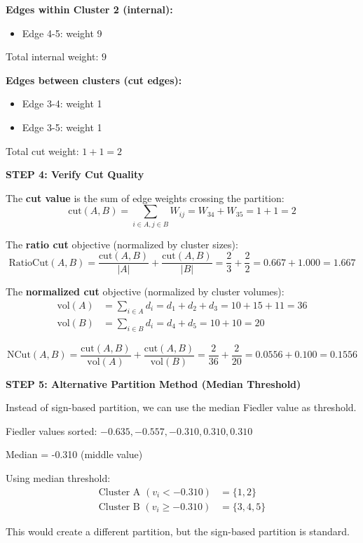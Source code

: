 \documentclass[12pt]{article}
\begin{document}
\begin{solution}
\textbf{Edges within Cluster 2 (internal):}
\begin{itemize}
    \item Edge 4-5: weight 9
\end{itemize}
Total internal weight: $9$

\textbf{Edges between clusters (cut edges):}
\begin{itemize}
    \item Edge 3-4: weight 1
    \item Edge 3-5: weight 1
\end{itemize}
Total cut weight: $1 + 1 = 2$

\textbf{STEP 4: Verify Cut Quality}

The \textbf{cut value} is the sum of edge weights crossing the partition:
\[
\text{cut}(A, B) = \sum_{i \in A, j \in B} W_{ij} = W_{34} + W_{35} = 1 + 1 = 2
\]

The \textbf{ratio cut} objective (normalized by cluster sizes):
\[
\text{RatioCut}(A, B) = \frac{\text{cut}(A, B)}{|A|} + \frac{\text{cut}(A, B)}{|B|} = \frac{2}{3} + \frac{2}{2} = 0.667 + 1.000 = 1.667
\]

The \textbf{normalized cut} objective (normalized by cluster volumes):
\begin{align*}
\text{vol}(A) &= \sum_{i \in A} d_i = d_1 + d_2 + d_3 = 10 + 15 + 11 = 36 \\
\text{vol}(B) &= \sum_{i \in B} d_i = d_4 + d_5 = 10 + 10 = 20
\end{align*}

\[
\text{NCut}(A, B) = \frac{\text{cut}(A, B)}{\text{vol}(A)} + \frac{\text{cut}(A, B)}{\text{vol}(B)} = \frac{2}{36} + \frac{2}{20} = 0.0556 + 0.100 = 0.1556
\]

\textbf{STEP 5: Alternative Partition Method (Median Threshold)}

Instead of sign-based partition, we can use the median Fiedler value as threshold.

Fiedler values sorted: $-0.635, -0.557, -0.310, 0.310, 0.310$

Median = -0.310 (middle value)

Using median threshold:
\begin{align*}
\text{Cluster A } (v_i < -0.310) &= \{1, 2\} \\
\text{Cluster B } (v_i \geq -0.310) &= \{3, 4, 5\}
\end{align*}

This would create a different partition, but the sign-based partition is standard.


\end{solution}
\end{document}
